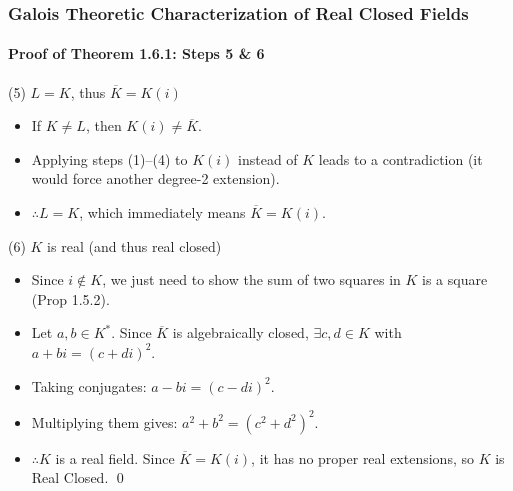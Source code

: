 \documentclass[11pt]{beamer}
\begin{document}
\begin{frame}
    \frametitle{Galois Theoretic Characterization of Real Closed Fields}
    \framesubtitle{Proof of Theorem 1.6.1: Steps 5 \& 6}

    \begin{block}{(5) $L = K$, thus $\overline{K} = K(i)$}
        \begin{itemize}
            \item If $K \neq L$, then $K(i) \neq \overline{K}$.
            \item Applying steps (1)--(4) to $K(i)$ instead of $K$ leads to a contradiction (it would force another degree-2 extension).
            \item $\therefore L = K$, which immediately means $\overline{K} = K(i)$.
        \end{itemize}
    \end{block}

    \begin{block}{(6) $K$ is real (and thus real closed)}
        \begin{itemize}
            \item Since $i \notin K$, we just need to show the sum of two squares in $K$ is a square (Prop 1.5.2).
            \item Let $a, b \in K^*$. Since $\overline{K}$ is algebraically closed, $\exists c, d \in K$ with $a+bi = (c+di)^2$.
            \item Taking conjugates: $a-bi = (c-di)^2$.
            \item Multiplying them gives: $a^2+b^2 = (c^2+d^2)^2$.
            \item $\therefore K$ is a real field. Since $\overline{K} = K(i)$, it has no proper real extensions, so $K$ is Real Closed. \qed
        \end{itemize}
    \end{block}
\end{frame}
\end{document}
